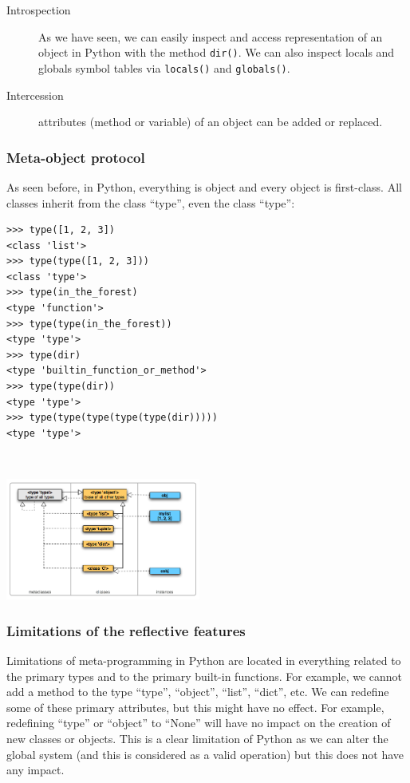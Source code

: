 \documentclass[a4paper,10pt]{article}
\begin{document}
\begin{description}
\item[Introspection] As we have seen, we can easily inspect and access representation of an object in Python with the method \lstinline|dir()|. We can also inspect locals and globals symbol tables via \lstinline|locals()| and \lstinline|globals()|.

\item[Intercession] attributes (method or variable) of an object can be added or replaced.
\end{description}

\subsubsection{Meta-object protocol}

As seen before, in Python, everything is object and every object is first-class. All classes inherit from the class ``type'', even the class ``type'':

\begin{minipage}[c]{.48\linewidth}
\begin{lstlisting}
>>> type([1, 2, 3])
<class 'list'>
>>> type(type([1, 2, 3]))
<class 'type'>
>>> type(in_the_forest)
<type 'function'>
>>> type(type(in_the_forest))
<type 'type'>
>>> type(dir)
<type 'builtin_function_or_method'>
>>> type(type(dir))
<type 'type'>
>>> type(type(type(type(type(dir)))))
<type 'type'>
\end{lstlisting}
~\\
\end{minipage} \hfill
\begin{minipage}[c]{.48\linewidth}
\includegraphics[height=4cm]{typesmap.png}
\end{minipage}

\subsubsection{Limitations of the reflective features}

Limitations of meta-programming in Python are located in everything related to the primary types and to the primary built-in functions.
For example, we cannot add a method to the type ``type'', ``object'', ``list'', ``dict'', etc.
We can redefine some of these primary attributes, but this might have no effect.
For example, redefining ``type'' or ``object'' to ``None'' will have no impact on the creation of new classes or objects.
This is a clear limitation of Python as we can alter the global system (and this is considered as a valid operation) but this does not have any impact.
\end{document}
